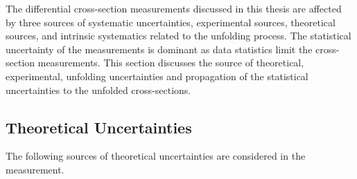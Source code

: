 The differential cross-section measurements discussed in this thesis are affected by three sources of systematic uncertainties, experimental sources, theoretical sources, and intrinsic systematics related to the unfolding process. The statistical uncertainty of the measurements is dominant as data statistics limit the cross-section measurements. This section discusses the source of theoretical, experimental, unfolding uncertainties and propagation of the statistical uncertainties to the unfolded cross-sections. 

\subsection{Theoretical Uncertainties}
\label{subsec:TheoryUnc}

The following sources of theoretical uncertainties are considered in the measurement.

